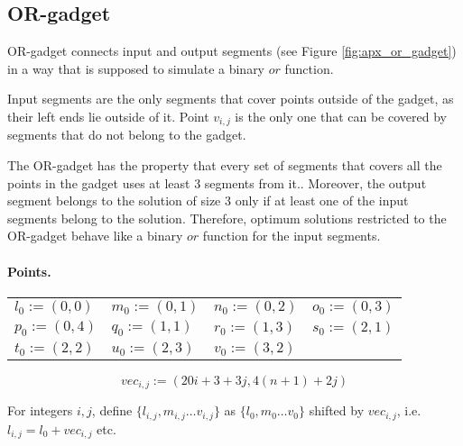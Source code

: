 \subsection{OR-gadget}

OR-gadget connects input and output segments (see Figure \ref{fig:apx_or_gadget})
in a way that is supposed to simulate a binary $or$ function.

Input segments are the only segments that cover points outside of the gadget,
as their left ends lie outside of it.
Point $v_{i,j}$ is the only one that can be covered
by segments that do not belong to the gadget.

The OR-gadget has the property that every set of segments
that covers all the points in the gadget uses at least 3 segments from it..
Moreover, the output segment belongs to the solution of size 3
only if at least one of the input segments belong to the solution.
Therefore, optimum solutions restricted to the OR-gadget behave
like a binary $or$ function for the input segments.


\paragraph{Points.}

\newcommand{\chooseOr}[3]{\mathsf{chooseOr}^{#1}_{#2,#3}}
\newcommand{\orMoveVariable}[2]{\mathsf{orMoveVariable}_{#1,#2}}
\newcommand{\pointsOr}[2]{\mathsf{pointsOr}_{#1,#2}}
\newcommand{\segmentsOr}[2]{\mathsf{segmentsOr}_{#1,#2}}



\newcommand{\clauseXFactor}{20}

\begin{center}
	\begin{tabular}{ l l l l}
		$l_0 := (0, 0)$ &
		$m_0 := (0, 1)$ &
		$n_0 := (0, 2)$ &
		$o_0 := (0, 3)$ \\
		$p_0 := (0, 4)$ &
		$q_0 := (1, 1)$ &
		$r_0 := (1, 3)$ &
		$s_0 := (2, 1)$ \\
		$t_0 := (2, 2)$ &
		$u_0 := (2, 3)$ &
		$v_0 := (3, 2)$ &
	\end{tabular}
\end{center}


$$vec_{i, j} := (\clauseXFactor i + 3 + 3j, 4(n+1) + 2j)$$

For integers $i,j$,
define 
$\{ l_{i, j}, m_{i, j} \ldots v_{i, j} \}$
as $\{l_0, m_0 \ldots v_0\}$ shifted by $vec_{i, j}$,
i.e. $l_{i,j} = l_0 + vec_{i,j}$ etc.


